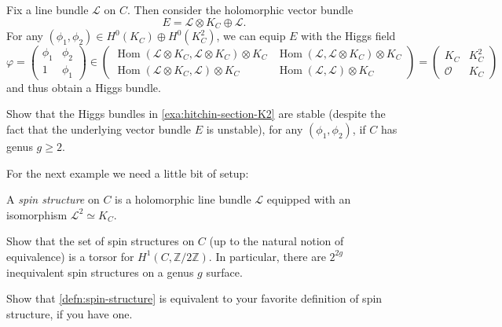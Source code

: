 \documentclass[12pt,letterpaper,reqno]{article}
\numberwithin{equation}{section}
\newcommand{\cL}{\ensuremath{\mathcal L}}
\newcommand{\cO}{\ensuremath{\mathcal O}}
\newcommand{\Z}{\ensuremath{\mathbb Z}}
\newcommand{\ti}[1]{\textit{#1}}
\DeclareMathOperator{\Hom}{Hom}
\begin{document}
\begin{example} \label{exa:hitchin-section-K2}
Fix a line bundle
$\cL$ on $C$.
Then consider the holomorphic vector
bundle
\begin{equation}
  E = \cL \otimes K_C \oplus \cL.
\end{equation}
For any $(\phi_1, \phi_2) \in H^0(K_C) \oplus H^0(K_C^2)$,
we can equip $E$ with the Higgs field
\begin{equation}
  \varphi = \begin{pmatrix} \phi_1 & \phi_2 \\ 1 & \phi_1 \end{pmatrix} \in \begin{pmatrix} \Hom(\cL \otimes K_C,\cL \otimes K_C) \otimes K_C & \Hom(\cL,\cL \otimes K_C) \otimes K_C \\ \Hom(\cL \otimes K_C,\cL) \otimes K_C & \Hom(\cL,\cL) \otimes K_C \end{pmatrix} = \begin{pmatrix} K_C & K_C^2 \\ \cO & K_C \end{pmatrix}
\end{equation}
and thus obtain a Higgs bundle.
\end{example}

\begin{exercise}
Show that the Higgs bundles in \autoref{exa:hitchin-section-K2} are stable
(despite the fact that the underlying
vector bundle $E$ is unstable),
for any $(\phi_1,\phi_2)$,
if $C$ has genus $g \ge 2$.
\end{exercise}

For the next example we need a little bit of setup:

\begin{defn} \label{defn:spin-structure} A \ti{spin structure} on $C$
is a holomorphic line bundle $\cL$ equipped with an isomorphism
$\cL^2 \simeq K_C$.
\end{defn}

\begin{exercise} Show that the set of spin structures on $C$ (up to
the natural notion of equivalence) is a torsor for $H^1(C,\Z/2\Z)$.
In particular, there are $2^{2g}$ inequivalent
spin structures on a genus $g$ surface.
\end{exercise}

\begin{exercise} Show that
\autoref{defn:spin-structure} is equivalent
to your favorite definition of spin structure, if you have one.
\end{exercise}
\end{document}
